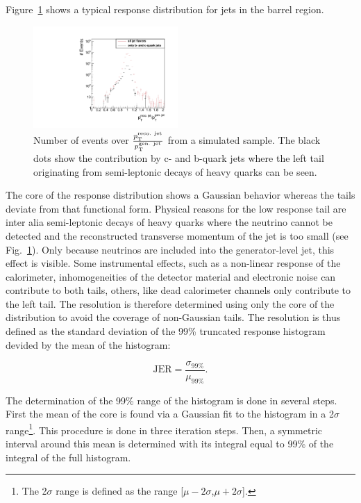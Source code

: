 Figure~\ref{res:fig:TypicalResponse} shows a typical response distribution for jets in the barrel region.
\begin{figure}[b]
  \centering
      \includegraphics[width=0.49\textwidth]{figures/resolution/generalApproach/intrinsicExampleContributionofBCQuarks.pdf}
  \caption{Number of events over $\frac{p_{\text{T}}^{\text{reco. jet}}}{p_{\text{T}}^{\text{gen. jet}}}$ from a simulated \GAMJET sample. 
           The black dots show the contribution by c- and b-quark jets where the left tail originating from semi-leptonic decays of heavy quarks can be seen.}  
  \label{res:fig:TypicalResponse}
\end{figure}
The core of the response distribution shows a Gaussian behavior whereas the tails deviate from that functional form.
Physical reasons for the low response tail are inter alia semi-leptonic decays of heavy quarks where the neutrino cannot be detected and the reconstructed transverse momentum of the jet is too small (see Fig.~\ref{res:fig:TypicalResponse}). 
Only because neutrinos are included into the generator-level jet, this effect is visible.
Some instrumental effects, such as a non-linear response of the calorimeter, inhomogeneities of the detector material and electronic noise can contribute to both tails, 
others, like dead calorimeter channels only contribute to the left tail. 
The resolution is therefore determined using only the core of the distribution to avoid the coverage of non-Gaussian tails.
The resolution is thus defined as the standard deviation of the 99\% truncated response histogram devided by the mean of the histogram:

\begin{equation*}\label{res:eq:resolutionFormula}
\text{JER} = \frac{\sigma_{99\%}}{\mu_{99\%}}.
\end{equation*}

The determination of the 99\% range of the histogram is done in several steps. 
First the mean of the core is found via a Gaussian fit to the histogram in a 2$\sigma$ range\footnote{The 2$\sigma$ range is defined as the range [$\mu - 2\sigma$,$\mu + 2\sigma$].}. 
This procedure is done in three iteration steps.
Then, a symmetric interval around this mean is determined with its integral equal to 99\% of the integral of the full histogram. 

